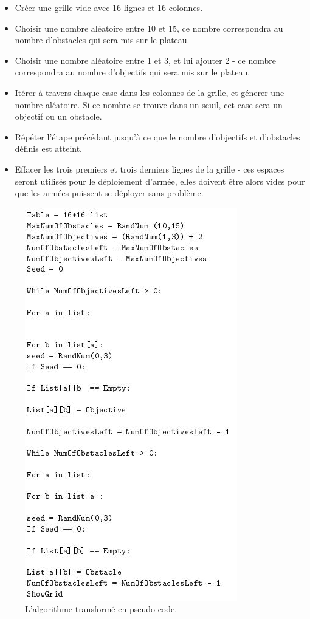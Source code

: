 \documentclass[a4paper, 11pt]{article}
\begin{document}
\begin{itemize}

\item Créer une grille vide avec 16 lignes et 16 colonnes.
\item Choisir une nombre aléatoire entre 10 et 15, ce nombre correspondra au nombre d'obstacles qui sera mis sur le plateau.
\item Choisir une nombre aléatoire entre 1 et 3, et lui ajouter 2 - ce nombre correspondra au nombre d'objectifs qui sera mis sur le plateau.
\item Itérer à travers chaque case dans les colonnes de la grille, et génerer une nombre aléatoire. Si ce nombre se trouve dans un seuil, cet case sera un objectif ou un obstacle.
\item Répéter l'étape précédant jusqu’à ce que le nombre d'objectifs et d'obstacles définis est atteint.
\item Effacer les trois premiers et trois derniers lignes de la grille - ces espaces seront utilisés pour le déploiement d'armée, elles doivent être alors vides pour que les armées puissent se déployer sans problème.

\end{itemize}


\begin{figure}[!htbp]

\includegraphics{PseudoCode-Terrain}

\caption{L'algorithme transformé en pseudo-code.}

\end{figure}
\end{document}
